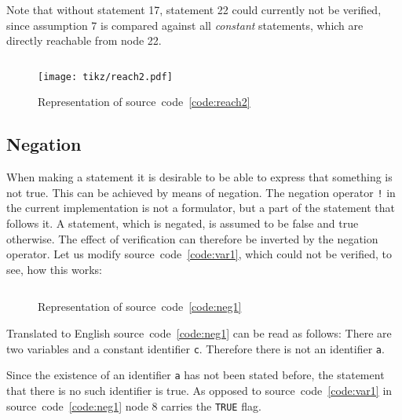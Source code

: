 \documentclass[british]{article}
\newenvironment{code}{\captionsetup{type=listing}}{}
\newcommand\prv{bc}
\newcommand\m[1]{\texttt{#1}}
\begin{document}
Note that without statement 17, statement 22 could currently not be verified,
since assumption 7 is compared against all \emph{constant} statements, which are
directly reachable from node 22.
\pagebreak{}

\begin{code}
\label{code:reach2}
\inputminted[linenos]{\prv}{examples/reach2.prove}
\end{code}

\begin{figure}[!h]
\caption{Representation of source~code~\ref{code:reach2}}\label{fig:reach2}
\centering
\texttt{[image: tikz/reach2.pdf]}
\end{figure}

\pagebreak{}

\subsection{Negation}
When making a statement it is desirable to be able to express that something is
not true. This can be achieved by means of negation. The negation operator \m{!}
in the current implementation is not a formulator, but a part of the statement
that follows it. A statement, which is negated, is assumed to be false and true
otherwise. The effect of verification can therefore be inverted by the negation
operator.  Let us modify source~code~\ref{code:var1}, which could not be
verified, to see, how this works:
\begin{code}
\label{code:neg1}
\inputminted[linenos]{\prv}{examples/neg1.prove}
\end{code}

\begin{figure}[!h]
\caption{Representation of source~code~\ref{code:neg1}}\label{fig:neg1}
\centering
{}
\end{figure}
Translated to English source~code~\ref{code:neg1} can be read as follows: There
are two variables and a constant identifier \m{c}. Therefore there is not an
identifier \m{a}.\newline

Since the existence of an identifier \m{a} has not been stated before, the
statement that there is no such identifier is true. As opposed to
source~code~\ref{code:var1} in source~code~\ref{code:neg1} node 8 carries the
\texttt{TRUE} flag.

\pagebreak{}

\begingroup
{}
\setlength\bibitemsep{10pt}
\printbibliography\
\endgroup
\end{document}

